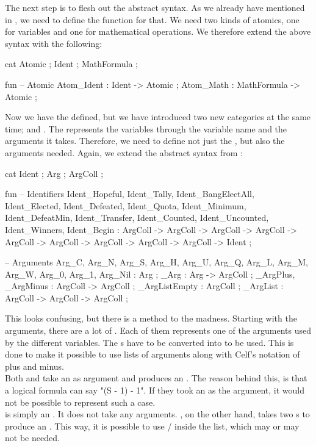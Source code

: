 The next step is to flesh out the abstract syntax. As we already have  mentioned in , we need to define the function for that. We need two kinds of atomics, one for variables and one for mathematical operations. We therefore extend the above syntax with the following:

\begin{lstgf}
    cat
        Atomic ; Ident ; MathFormula ;

    fun
        -- Atomic
        Atom_Ident : Ident -> Atomic ;
        Atom_Math : MathFormula -> Atomic ;
\end{lstgf}

Now we have the  defined, but we have introduced two new categories at the same time;  and . The  represents the variables through the variable name and the arguments it takes. Therefore, we need to define not just the , but also the arguments needed. Again, we extend the abstract syntax from :

\begin{lstgf}
    cat
        Ident ; Arg ; ArgColl ;

    fun
        -- Identifiers
        Ident_Hopeful, Ident_Tally, Ident_BangElectAll, Ident_Elected, Ident_Defeated, Ident_Quota, Ident_Minimum,
        Ident_DefeatMin, Ident_Transfer, Ident_Counted, Ident_Uncounted, Ident_Winners, Ident_Begin : ArgColl ->
        ArgColl -> ArgColl -> ArgColl -> ArgColl -> ArgColl -> ArgColl -> ArgColl -> ArgColl -> Ident ;
        
        -- Arguments
        Arg_C, Arg_N, Arg_S, Arg_H, Arg_U, Arg_Q, Arg_L, Arg_M, Arg_W, Arg_0, Arg_1, Arg_Nil : Arg ;
        _Arg : Arg -> ArgColl ;
        _ArgPlus, _ArgMinus : ArgColl -> ArgColl ;
        _ArgListEmpty : ArgColl ;
        _ArgList : ArgColl -> ArgColl ->  ArgColl ;
\end{lstgf}

This looks confusing, but there is a method to the madness. Starting with the arguments, there are a lot of . Each of them represents one of the arguments used by the different variables. The s have to be converted into  to be used. This is done to make it possible to use lists of arguments along with Celf's notation of plus and minus. \\
Both  and  take an  as argument and produces an . The reason behind this, is that a logical formula can say "(S - 1) - 1". If they took an  as the argument, it would not be possible to represent such a case.\\
 is simply an . It does not take any arguments. , on the other hand, takes two s to produce an . This way, it is possible to use / inside the list, which may or may not be needed.

